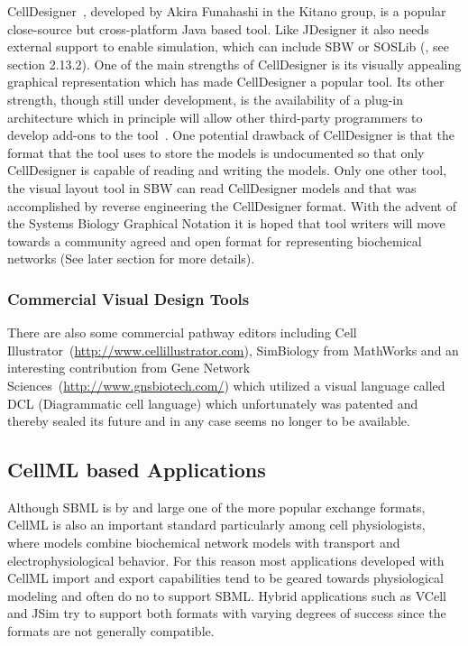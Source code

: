 \documentclass[12pt]{article}
\begin{document}
CellDesigner~\citep{Kitano:2005:Nat-Biotechnol}, developed by Akira
Funahashi in the Kitano group, is a popular close-source but
cross-platform Java based tool. Like JDesigner it also needs
external support to enable simulation, which can include SBW or
SOSLib (\citep{Machne:2006}, see section 2.13.2). One of the main
strengths of CellDesigner is its visually appealing graphical
representation which has made CellDesigner a popular tool. Its
other strength, though still under development, is the availability
of a plug-in architecture which in principle will allow other
third-party programmers to develop add-ons to the
tool~\citep{andreas:2008}. One potential drawback of CellDesigner is
that the format that the tool uses to store the models is
undocumented so that only CellDesigner is capable of reading and
writing the models. Only one other tool, the visual layout tool in
SBW can read CellDesigner models and that was accomplished by
reverse engineering the CellDesigner format. With the advent of the
Systems Biology Graphical Notation it is hoped that tool writers
will move towards a community agreed and open format for
representing biochemical networks (See later section for more
details).

\subsubsection{Commercial Visual Design Tools}

There are also some commercial pathway editors including Cell
Illustrator~(\url{http://www.cellillustrator.com}), SimBiology from
MathWorks and an interesting contribution from Gene Network
Sciences~(\url{http://www.gnsbiotech.com/}) which utilized a visual
language called DCL (Diagrammatic cell language) which unfortunately
was patented and thereby sealed its future and in any case seems no
longer to be available.

\subsection{CellML based Applications}

Although SBML is by and large one of the more popular exchange
formats, CellML is also an important standard particularly among
cell physiologists, where models combine biochemical network models
with transport and electrophysiological behavior. For this reason
most applications developed with CellML import and export
capabilities tend to be geared towards physiological modeling and
often do no to support SBML. Hybrid applications such as VCell and
JSim try to support both formats with varying degrees of success
since the formats are not generally compatible.
\end{document}
